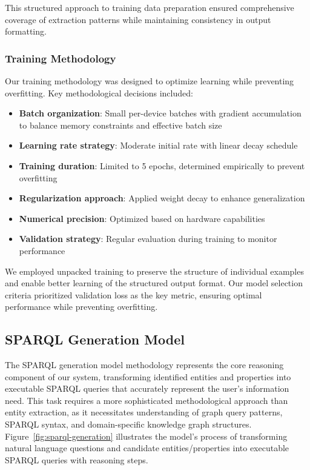 This structured approach to training data preparation ensured comprehensive coverage of extraction patterns while maintaining consistency in output formatting.

\subsubsection{Training Methodology}
Our training methodology was designed to optimize learning while preventing overfitting. Key methodological decisions included:

\begin{itemize}
    \item \textbf{Batch organization}: Small per-device batches with gradient accumulation to balance memory constraints and effective batch size
    \item \textbf{Learning rate strategy}: Moderate initial rate with linear decay schedule
    \item \textbf{Training duration}: Limited to 5 epochs, determined empirically to prevent overfitting
    \item \textbf{Regularization approach}: Applied weight decay to enhance generalization
    \item \textbf{Numerical precision}: Optimized based on hardware capabilities
    \item \textbf{Validation strategy}: Regular evaluation during training to monitor performance
\end{itemize}

We employed unpacked training to preserve the structure of individual examples and enable better learning of the structured output format. Our model selection criteria prioritized validation loss as the key metric, ensuring optimal performance while preventing overfitting.

\subsection{SPARQL Generation Model}
\label{sparql-gen}
The SPARQL generation model methodology represents the core reasoning component of our system, transforming identified entities and properties into executable SPARQL queries that accurately represent the user's information need. This task requires a more sophisticated methodological approach than entity extraction, as it necessitates understanding of graph query patterns, SPARQL syntax, and domain-specific knowledge graph structures. Figure~\ref{fig:sparql-generation} illustrates the model's process of transforming natural language questions and candidate entities/properties into executable SPARQL queries with reasoning steps.

